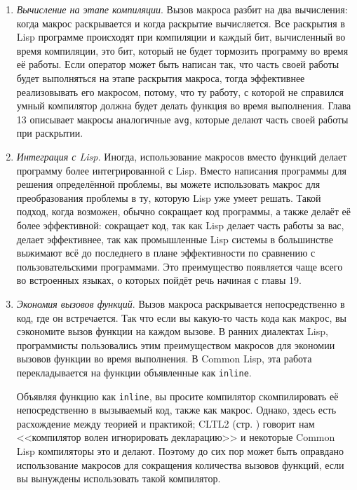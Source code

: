 \documentclass[12pt, a4paper]{article} %
\begin{document}
\begin{enumerate}
    \item \textit{Вычисление на этапе компиляции}. Вызов макроса разбит на два вычисления: когда макрос раскрывается и когда раскрытие вычисляется. Все раскрытия в Lisp программе происходят при компиляции и каждый бит, вычисленный во время компиляции, это бит, который не будет тормозить программу во время её работы. Если оператор может быть написан так, что часть своей работы будет выполняться на этапе раскрытия макроса, тогда эффективнее реализовывать его макросом, потому, что ту работу, с которой не справился умный компилятор должна будет делать функция во время выполнения. Глава 13 описывает макросы аналогичные \texttt{avg}, которые делают часть своей работы при раскрытии.

    \item \textit{Интеграция с Lisp.} Иногда, использование макросов вместо функций делает программу более интегрированной с Lisp. Вместо написания программы для решения определённой проблемы, вы можете использовать макрос для преобразования проблемы в ту, которую Lisp уже умеет решать. Такой подход, когда возможен, обычно сокращает код программы, а также делаёт её более эффективной: сокращает код, так как Lisp делает часть работы за вас, делает эффективнее, так как промышленные Lisp системы в большинстве выжимают всё до последнего в плане эффективности по сравнению с пользовательскими программами. Это преимущество появляется чаще всего во встроенных языках, о которых пойдёт речь начиная с главы 19.
    
    \item \textit{Экономия вызовов функций}. Вызов макроса раскрывается непосредственно в код, где он встречается. Так что если вы какую-то часть кода как макрос, вы сэкономите вызов функции на каждом вызове. В ранних диалектах Lisp, программисты пользовались этим преимуществом макросов для экономии вызовов функции во время выполнения. В Common Lisp, эта работа перекладывается на функции объявленные как \texttt{inline}.

    Объявляя функцию как \texttt{inline}, вы просите компилятор скомпилировать её непосредственно в вызываемый код, также как макрос. Однако, здесь есть расхождение между теорией и практикой; \textsc{CLTL2} (стр. \pageref{229}) говорит нам <<компилятор волен игнорировать декларацию>> и некоторые Common Lisp компиляторы это и делают. Поэтому до сих пор может быть оправдано использование макросов для сокращения количества вызовов функций, если вы вынуждены использовать такой компилятор.
\end{enumerate}
\end{document}
